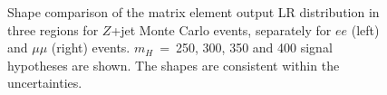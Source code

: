 \begin{figure}[!hbtp]
\caption{Shape comparison of the matrix element output LR distribution in three \met regions for $Z$+jet Monte Carlo events, separately for $ee$ (left) and $\mu\mu$ (right) events. $m_H$~=~250, 300, 350 and 400 \GeVcc signal hypotheses are shown. The shapes are consistent within the uncertainties.}
\label{fig:LRshapeMET}                                                                                          
\end{figure}

